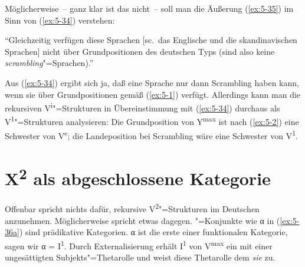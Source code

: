 \documentclass[output=paper]{LSP/langsci}
\begin{document}
Möglicherweise~-- ganz klar ist das nicht~-- soll man die Äußerung (\ref{ex:5-35}) im Sinn von (\ref{ex:5-34}) verstehen:

\begin{exe}
\ex%
\label{ex:5-35}
"`Gleichzeitig verfügen diese Sprachen [sc.\ das Englische und die skandinavischen Sprachen] nicht über Grundpositionen des deutschen Typs (sind also keine \textit{scrambling}{}"=Sprachen)."'  \citep[5f.]{FreyTappe1991}
\end{exe}
Aus (\ref{ex:5-34}) ergibt sich ja, daß eine Sprache nur dann Scrambling haben kann, wenn sie über Grundpositionen gemäß (\ref{ex:5-1}) verfügt. Allerdings kann man die rekursiven V\textsuperscript{i}{}"=Strukturen in Übereinstimmung mit (\ref{ex:5-34}) durchaus als V\textsuperscript{1}{}"=Strukturen analysieren: Die Grundposition von Y\textsuperscript{max} ist nach (\ref{ex:5-2}) eine Schwester von V\textsuperscript{e}; die Landeposition bei Scrambling wäre eine Schwester von V\textsuperscript{1}.

\section{X\textsuperscript{2} als abgeschlossene Kategorie}%
\label{sec:5-4}

Offenbar spricht nichts dafür, rekursive V\textsuperscript{2}{}"=Strukturen im Deutschen anzunehmen. Möglicherweise spricht etwas dagegen. "=Konjunkte wie α in (\ref{ex:5-36a}) sind prädikative Kategorien. α ist die erste  einer funktionalen Kategorie, sagen wir α = I\textsuperscript{1}. Durch Externalisierung erhält I\textsuperscript{1 }von V\textsuperscript{max} ein  mit einer ungesättigten Subjekts"=Thetarolle und weist diese Thetarolle dem  \textit{sie} zu.
\end{document}
